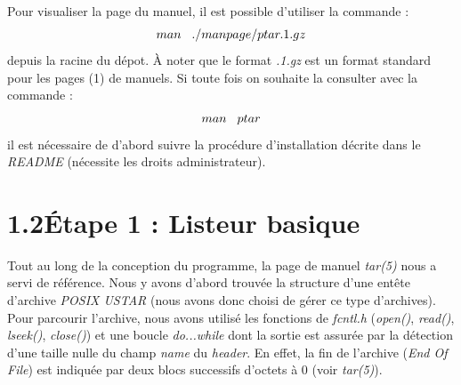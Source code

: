 \documentclass[12pt, a4paper]{report}
\begin{document}
\hspace{0.5cm}Pour visualiser la page du manuel, il est possible d'utiliser la commande : \[man\hspace{0.3cm}./manpage/ptar.1.gz\]  depuis la racine du dépot. À noter que le format \textit{.1.gz} est un format standard pour les pages (1) de manuels. Si toute fois on souhaite la consulter avec la commande : \[man\hspace{0.3cm}ptar\] il est nécessaire de d'abord suivre la procédure d'installation décrite dans le \textit{README} (nécessite les droits administrateur).

\section*{\hspace{0.6cm}1.2\hspace{0.6cm}Étape 1 : Listeur basique}
\hspace{1cm}Tout au long de la conception du programme, la page de manuel \textit{tar(5)} nous a servi de référence. Nous y avons d'abord trouvée la structure d'une entête d'archive \textit{POSIX USTAR} (nous avons donc choisi de gérer ce type d'archives). \\

\hspace{0.5cm}Pour parcourir l'archive, nous avons utilisé les fonctions de \textit{fcntl.h} (\textit{open()}, \textit{read()}, \textit{lseek()}, \textit{close()}) et une boucle \textit{do...while} dont la sortie est assurée par la détection d'une taille nulle du champ \textit{name} du \textit{header}. En effet, la fin de l'archive (\textit{End Of File}) est indiquée par deux blocs successifs d'octets à 0 (voir \textit{tar(5)}). \\
\end{document}
